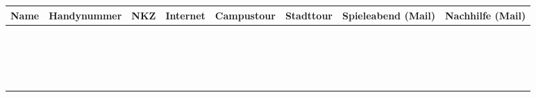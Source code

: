 \documentclass{article}
\begin{document}
\renewcommand{\arraystretch}{2}
\begin{table}[ht!]
  \begin{center}
    \begin{tabular}{|p{7cm}|p{5cm}|p{3cm}|c|c|c|c|c|} 
    	\toprule
      \textbf{Name} & \textbf{Handynummer} & \textbf{NKZ} & \textbf{Internet} & \textbf{Campustour} & \textbf{Stadttour} & \textbf{Spieleabend (Mail)} & \textbf{Nachhilfe (Mail)} \\
      \midrule 
      & & & & & & &  \\ \hline
      & & & & & & &  \\ \hline
      & & & & & & &  \\ \hline
      & & & & & & &  \\ \hline
      & & & & & & &  \\ \hline
      & & & & & & &  \\ \hline
      & & & & & & &  \\ \hline
      & & & & & & &  \\ \hline
      & & & & & & &  \\ \hline
      & & & & & & &  \\ \hline
      & & & & & & &  \\ \hline
      & & & & & & &  \\ \hline
      & & & & & & &  \\ \hline
      & & & & & & &  \\ \hline
      & & & & & & &  \\ \hline
      & & & & & & &  \\ \hline
      & & & & & & &  \\ \hline
      & & & & & & &  \\
      \bottomrule
    \end{tabular}
  \end{center}
\end{table}
\end{document}
